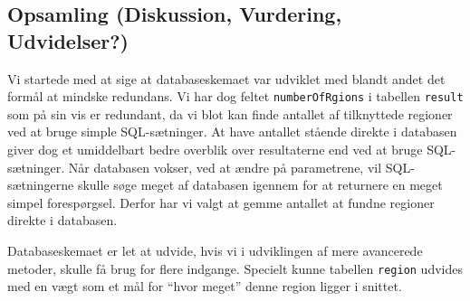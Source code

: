 {\subsection{Opsamling (Diskussion, Vurdering, Udvidelser?)}
Vi startede med at sige at databaseskemaet var udviklet med blandt andet
det formål at mindske redundans. Vi har dog feltet
\texttt{numberOfRgions} i tabellen \texttt{result} som på sin vis er
redundant, da vi blot kan finde antallet af tilknyttede regioner ved at
bruge simple SQL-sætninger. At have antallet stående direkte i databasen
giver dog et umiddelbart bedre overblik over resultaterne end ved at
bruge SQL-sætninger. Når databasen vokser, ved at ændre på parametrene,
vil SQL-sætningerne skulle søge meget af databasen igennem for at
returnere en meget simpel forespørgsel. Derfor har vi valgt at gemme
antallet at fundne regioner direkte i databasen.

Databaseskemaet er let at udvide, hvis vi i udviklingen af mere
avancerede metoder, skulle få brug for flere indgange. Specielt kunne
tabellen \texttt{region} udvides med en vægt som et mål for ``hvor
meget'' denne region ligger i snittet.

}
